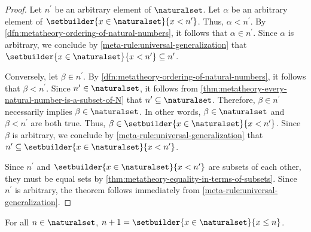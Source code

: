 \begin{proof}
    Let \( n^{\prime} \) be an arbitrary element of \( \naturalset \).
    Let \( \alpha \) be an arbitrary element of \( \setbuilder{x \in \naturalset}{x < n^{\prime}} \).
    Thus, \( \alpha < n^{\prime} \).
    By \cref{dfn:metatheory-ordering-of-natural-numbers}, it follows that \( \alpha \in n^{\prime} \).
    Since \( \alpha \) is arbitrary, we conclude by \cref{meta-rule:universal-generalization} that \( \setbuilder{x \in \naturalset}{x < n^{\prime}} \subseteq n^{\prime} \).

    \vspace{0.3cm}
    \noindent
    Conversely, let \( \beta \in n^{\prime} \).
    By \cref{dfn:metatheory-ordering-of-natural-numbers}, it follows that \( \beta < n^{\prime} \).
    Since \( n^{\prime} \in \naturalset \), it follows from \cref{thm:metatheory-every-natural-number-is-a-subset-of-N} that
    \( n^{\prime} \subseteq \naturalset \).
    Therefore, \( \beta \in n^{\prime} \) necessarily implies \( \beta \in \naturalset \).
    In other words, \( \beta \in \naturalset \) and \( \beta < n^{\prime} \) are both true.
    Thus, \( \beta \in \setbuilder{x \in \naturalset}{x < n^{\prime}} \).
    Since \( \beta \) is arbitrary, we conclude by \cref{meta-rule:universal-generalization} that \( n^{\prime} \subseteq \setbuilder{x \in \naturalset}{x < n^{\prime}} \).

    \vspace{0.3cm}
    \noindent
    Since \( n^{\prime} \) and \( \setbuilder{x \in \naturalset}{x < n^{\prime}} \) are subsets of each other, they must be
    equal sets by \cref{thm:metatheory-equality-in-terms-of-subsets}.
    Since \( n^{\prime} \) is arbitrary, the theorem follows immediately from \cref{meta-rule:universal-generalization}.
\end{proof}

\begin{thm}
     \label{thm:metatheory-every-n-plus-one-is-the-set-of-all-natural-numbers-less-than-or-equal-to-n}
    For all \( n \in \naturalset \), \( n + 1 = \setbuilder{x \in \naturalset }{x \leq n} \).
\end{thm}

